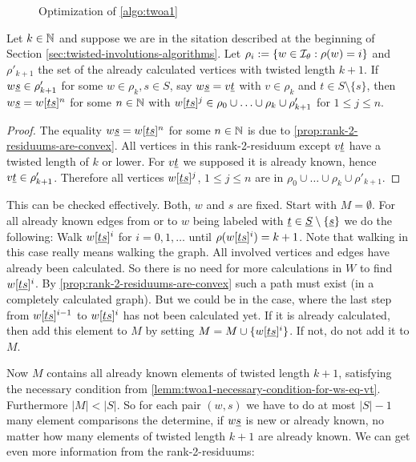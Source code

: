 \begin{figure}[ht]
	\centering
	
	\caption{Optimization of \ref{algo:twoa1}}
	\label{fig:optimization-of-twoa1}
\end{figure}

\begin{lemm}
	Let $k \in \mathbb{N}$ and suppose we are in the sitation described at the beginning of Section \ref{sec:twisted-involutions-algorithms}. Let $\rho_i := \{ w \in \mathcal{I}_{\theta} : \rho(w) = i \}$ and $\rho'_{k+1}$ the set of the already calculated vertices with twisted length $k+1$. If $w \underline{s} \in \rho'_{k+1}$ for some $w \in \rho_k, s \in S$, say $w \underline{s} = v \underline{t}$ with $v \in \rho_k$ and $t \in S \setminus \{s\}$, then $w \underline{s} = w[\underline{t} \underline{s}]^n$ for some $n \in \mathbb{N}$ with $w[\underline{t} \underline{s}]^j \in \rho_0 \cup \ldots \cup \rho_k \cup \rho'_{k+1}$ for $1 \leq j \leq n$.

	\begin{proof}
		The equality $w \underline{s} = w[\underline{t} \underline{s}]^n$ for some $n \in \mathbb{N}$ is due to \ref{prop:rank-2-residuums-are-convex}. All vertices in this rank-2-residuum except $v \underline{t}$ have a twisted length of $k$ or lower. For $v \underline{t}$ we supposed it is already known, hence $v \underline{t} \in \rho'_{k+1}$. Therefore all vertices $w[\underline{t} \underline{s}]^j$, $1 \leq j \leq n$ are in $\rho_0 \cup \ldots \cup \rho_k \cup \rho'_{k+1}$.
	\end{proof}
\end{lemm}

This can be checked effectively. Both, $w$ and $s$ are fixed. Start with $M = \emptyset$. For all already known edges from or to $w$ being labeled with $\underline{t} \in \underline{S} \setminus \{\underline{s}\}$ we do the following: Walk $w[\underline{t} \underline{s}]^i$ for $i = 0,1,\ldots$ until $\rho(w[\underline{t} \underline{s}]^i) = k + 1$. Note that walking in this case really means walking the graph. All involved vertices and edges have already been calculated. So there is no need for more calculations in $W$ to find $w[\underline{t} \underline{s}]^i$. By \ref{prop:rank-2-residuums-are-convex} such a path must exist (in a completely calculated graph). But we could be in the case, where the last step from $w[\underline{t} \underline{s}]^{i-1}$ to $w[\underline{t} \underline{s}]^{i}$ has not been calculated yet. If it is already calculated, then add this element to $M$ by setting $M = M \cup \{ w[\underline{t} \underline{s}]^{i} \}$. If not, do not add it to $M$.

Now $M$ contains all already known elements of twisted length $k+1$, satisfying the necessary condition from \ref{lemm:twoa1-necessary-condition-for-ws-eq-vt}. Furthermore $|M| < |S|$. So for each pair $(w,s)$ we have to do at most $|S|-1$ many element comparisons the determine, if $w \underline{s}$ is new or already known, no matter how many elements of twisted length $k+1$ are already known. We can get even more information from the rank-2-residuums:


